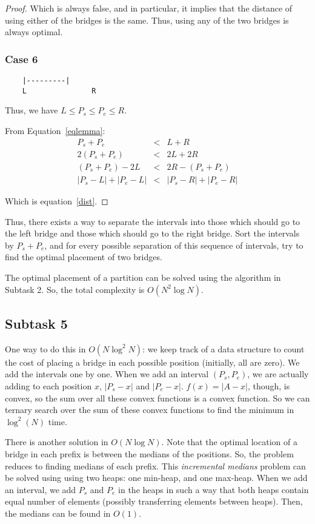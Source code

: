 \documentclass[a4paper]{article}
\begin{document}
\begin{proof}
    Which is always false, and in particular, it implies that the distance
    of using either of the bridges is the same. Thus, using any of the two
    bridges is always optimal.

    \subsubsection*{Case 6}

    \begin{verbatim}
    |---------|
    L               R
    \end{verbatim}

    Thus, we have $L \le P_s \le P_e \le R$.

    From Equation~\ref{eqlemma}:
    \begin{eqnarray*}
        P_s + P_e &<& L + R \\
        2(P_s + P_e) &<& 2L + 2R \\
        (P_s + P_e) - 2L &<& 2R - (P_s + P_e) \\
        |P_s - L| + |P_e - L| &<& |P_s - R| + |P_e - R|
    \end{eqnarray*}

    Which is equation~\ref{dist}.

\end{proof}

Thus, there exists a way to separate the intervals into those which should
go to the left bridge and those which should go to the right bridge. Sort the intervals by $P_s + P_e$, and for every possible separation of this sequence of intervals, try to find the optimal placement of two bridges.

The optimal placement of a partition can be solved using the algorithm in Subtask 2. So, the total complexity is $O(N^2 \log N)$.

\subsection*{Subtask 5}

One way to do this in $O(N \log^2 N)$: we keep track of a data structure to count the cost of placing a bridge in each possible position (initially, all are zero). We add the intervals one by one. When we add an interval $(P_s, P_e)$, we are actually adding to each position $x$, $|P_s - x|$ and $|P_e - x|$. $f(x) = |A - x|$, though, is convex, so the sum over all these convex functions is a convex function. So we can ternary search over the sum of these convex functions to find the minimum in $\log^2 (N)$ time.

There is another solution in $O(N \log N)$. Note that the optimal location of a bridge in each prefix is between the medians of the positions. So, the problem reduces to finding medians of each prefix. This \textit{incremental medians} problem can be solved using using two heaps: one min-heap, and one max-heap. When we add an interval, we add $P_s$ and $P_e$ in the heaps in such a way that both heaps contain equal number of elements (possibly transferring elements between heaps). Then, the medians can be found in $O(1)$.
\end{document}
